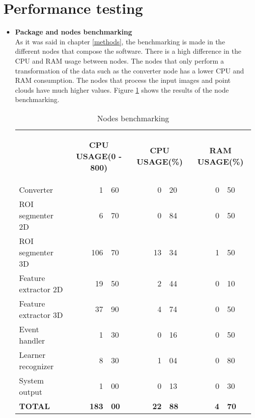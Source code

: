 \section{Performance testing}

	\begin{itemize}
		\item{\textbf{Package and nodes benchmarking}}
		\\

			As it was said in chapter \ref{methods}, the benchmarking is made in the different nodes that compose the software. 
			There is a high difference in the CPU and RAM usage between nodes.
			The nodes that only perform a transformation of the data such as the converter node has a lower CPU and RAM consumption.
			The nodes that process the input images and point clouds have much higher values. 
			Figure \ref{node} shows the results of the node benchmarking. 


\begin{table}[H]
\centering
\begin{tabular} {l c r@{.}l c r@{.}l c r@{.}l }
\toprule
\addlinespace[3mm]
   \multicolumn{1}{c}{\begin{center}\textbf{NODES}\end{center}} &
   \multicolumn{3}{c}{\begin{center}\textbf{CPU USAGE(0 - 800)}\end{center}} &
   \multicolumn{3}{c}{\begin{center}\textbf{CPU USAGE(\%)}\end{center}} &
   \multicolumn{3}{c}{\begin{center}\textbf{RAM USAGE(\%)}\end{center}} &\\
\addlinespace[-3mm]
\midrule
Converter && 1&60 && 0&20 && 0&50 \\
ROI segmenter 2D && 6&70 && 0&84 && 0&50\\
ROI segmenter 3D && 106&70 && 13&34 && 1&50\\
Feature extractor 2D && 19&50 && 2&44 && 0&10\\
Feature extractor 3D && 37&90 && 4&74 && 0&50\\
Event handler && 1&30 && 0&16 && 0&50 \\
Learner recognizer && 8&30 && 1&04 && 0&80 \\
System output && 1&00 && 0&13 && 0&30 \\
\textbf{TOTAL} && \textbf{183}&\textbf{00} &&\textbf{22}&\textbf{88} && \textbf{4}&\textbf{70} \\
\bottomrule
\end{tabular}
\caption{Nodes benchmarking}
\label{node}


\end{table}
\end{itemize}
